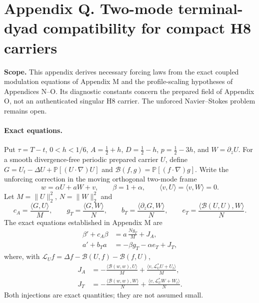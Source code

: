 \clearpage
\section*{Appendix Q. Two-mode terminal-dyad compatibility for compact H8 carriers}
\noindent\textbf{Scope.}
This appendix derives necessary forcing laws from the exact coupled modulation
equations of Appendix M and the profile-scaling hypotheses of Appendices N--O.
Its diagnostic constants concern the prepared field of Appendix O, not an
authenticated singular H8 carrier. The unforced Navier--Stokes problem remains open.

\paragraph{Exact equations.}
Put $\tau=T-t$, $0<h<1/6$,
$A=\frac12+h$, $D=\frac12-h$, $p=\frac12-3h$, and
$W=\partial_zU$.
For a smooth divergence-free periodic prepared carrier $U$, define
$G=U_t-\Delta U+\mathbb P[(U\cdot\nabla)U]$ and
$\mathcal B(f,g)=\mathbb P[(f\cdot\nabla)g]$.
Write the unforcing correction in the moving orthogonal two-mode frame
\[
 w=\alpha U+aW+v,\qquad \beta=1+\alpha,\qquad
 \langle v,U\rangle=\langle v,W\rangle=0.
\]
Let $M=\|U\|_2^2$, $N=\|W\|_2^2$ and
\[
 c_A=\frac{\langle G,U\rangle}{M},\qquad
 g_T=\frac{\langle G,W\rangle}{N},\qquad
 b_T=\frac{\langle\partial_zG,W\rangle}{N},\qquad
 e_T=\frac{\langle\mathcal B(U,U),W\rangle}{N}.
\]
The exact equations established in Appendix M are
\begin{align}
 \beta'+c_A\beta &= a\,\frac{Ng_T}{M}+J_A,
 \label{eq:Q-amplitude}\\
 a'+b_Ta &= -\beta g_T-\alpha e_T+J_T,
 \label{eq:Q-translation}
\end{align}
where, with $\mathcal L_U f=\Delta f-\mathcal B(U,f)-\mathcal B(f,U)$,
\begin{align*}
 J_A&=-\frac{\langle\mathcal B(w,w),U\rangle}{M}
       +\frac{\langle v,\mathcal L_U^*U+U_t\rangle}{M},\\
 J_T&=-\frac{\langle\mathcal B(w,w),W\rangle}{N}
       +\frac{\langle v,\mathcal L_U^*W+W_t\rangle}{N}.
\end{align*}
Both injections are exact quantities; they are not assumed small.

